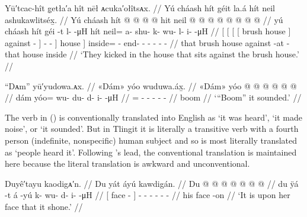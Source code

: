 \ex\label{ex:89-189-kick-in-against-brush-house}%
%
\begingl
	\glpreamble	Yū′tcac-hît g̣etła′a hît nēł ᴀcuka′ołîtsᴀx. //
	\glpreamble	Yú cháash hít géit la.á hít neil ashukawlitséx̱. //
	\gla	{} Yú {} {} {} cháash hít {}  @ {} {}
				 @ {} @ {} @ {} {} hit {}
		neil @  @ {} @ {} @ {} @ {} @ {} @ {} @ {} //
	\glb	{} yú {} {} {} cháash hít {} géi -t {}
				l-  -μH {} {} hít {}
		neil= a- shu- k- wu- l- i-  -μH //
	\glc	{}[  {}[ {}[ {}[ brush house {}] against - {}]
				-  - \· {}] house {}]
		inside= - end- - - - -  - //
	\gld	{} that {} {} {} brush house {} against -at {}
				 {} {} -that {} house {}
		inside  {} {} {} {} {} {} {} //
	\glft	‘They kicked in the house that sits against the brush house.’
		//
\endgl
\xe

\ex\label{ex:89-190-boom-it-sounded}%
%
\begingl
	\glpreamble	“Dᴀm” yū′yudowa.ᴀx. //
	\glpreamble	«\!Dám\!» yóo wuduwa.áx̱. //
	\gla	«\!Dám\!» yóo @  @ {} @ {} @ {} @ {} @ {} //
	\glb	\pqp{}dám yóo= wu- du- d- i-  -μH //
	\glc	\pqp{} = - - - -  - //
	\gld	\pqp{}boom   {} {} {} {} {} //
	\glft	‘“Boom” it sounded.’
		//
\endgl
\xe

The verb  in (\lastx) is conventionally translated into English as ‘it was heard’, ‘it made noise’, or ‘it sounded’.
But in Tlingit it is literally a transitive verb with a fourth person (indefinite, nonspecific) human subject and so is most literally translated as ‘people heard it’.
Following \citeauthor{swanton:1909}’s lead, the conventional translation is maintained here because the literal translation is awkward and unconventional.

\ex\label{ex:89-191-shone-on-her-face}%
%
\begingl
	\glpreamble	Duyê′tayu kaodigᴀ′n. //
	\glpreamble	Du yát áyú kawdigán. //
	\gla	{} Du  @ {} {}  @ {}
		 @ {} @ {} @ {} @ {} @ {} //
	\glb	{} du ÿá -t {} á -yú
		k- wu- d- i-  -μH //
	\glc	{}[  face - {}]  -
		- - - -  - //
	\gld	{} his face -on {}  {}
		 {} {} {} {} {} //
	\glft	‘It is upon her face that it shone.’
		//
\endgl
\xe

